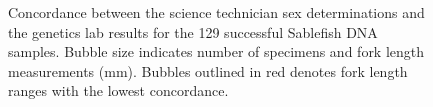 \documentclass[12pt]{article}\usepackage[]{graphicx}\usepackage[]{color}
\begin{document}
\begin{figure}[htb]

 \hfill{}

\caption{Concordance between the science technician sex determinations and the genetics lab results for the 129 successful Sablefish DNA samples. Bubble size indicates number of specimens and fork length measurements (mm). Bubbles outlined in red denotes fork length ranges with the lowest concordance.}\label{fig:figure4}
\end{figure}
\end{document}
